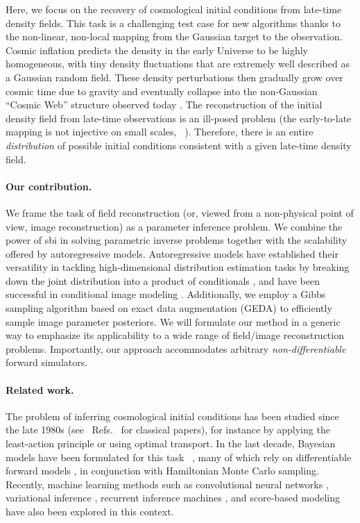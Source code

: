 Here, we focus on the recovery of cosmological initial conditions from late-time density fields. This task is a challenging test case for new algorithms thanks to the non-linear, non-local mapping from the Gaussian target to the observation.  Cosmic inflation predicts the density in the early Universe to be highly homogeneous, with tiny density fluctuations that are extremely well described as a Gaussian random field. These density perturbations then gradually grow over cosmic time due to gravity and eventually collapse into the non-Gaussian ``Cosmic Web'' structure observed today \cite{Bond:1995yt}. 
The reconstruction of the initial density field from late-time observations is an ill-posed problem (the early-to-late mapping is not injective on small scales, ~\cite[\eg,][]{Brenier:2003xs}). Therefore, there is an entire {\it distribution} of possible initial conditions consistent with a given late-time density field. 

\paragraph{Our contribution.}  We frame the task of field reconstruction (or, viewed from a non-physical point of view, image reconstruction) as a parameter inference problem.  We combine the power of \gls*{sbi} in solving parametric inverse problems together with the scalability offered by autoregressive models. Autoregressive models have established their versatility in tackling high-dimensional distribution estimation tasks by breaking down the joint distribution into a product of conditionals \cite{Papamakarios:2017tec, Uria:2016aa}, and have been successful in conditional image modeling \cite{van:2016pixel}. Additionally, we employ a Gibbs sampling algorithm based on exact data augmentation (GEDA) \cite{Marnissi:2019aa} to efficiently sample image parameter posteriors.
We will formulate our method in a generic way to emphasize its applicability to a wide range of field/image reconstruction problems. Importantly, our approach accommodates arbitrary \textit{non-differentiable} forward simulators.

\paragraph{Related work.} The problem of inferring cosmological initial conditions has been studied since the late 1980s (see \eg~Refs.~\cite{Croft:1996jw, Frisch:2001vw, Gramann:1993aa, Nusser:1992aa, Peebles:2020aa, Weinberg:1992aa} for classical papers), for instance by applying the least-action principle or using optimal transport. In the last decade, Bayesian models have been formulated for this task ~\cite[\eg,][]{Jasche:2012kq}, many of which rely on differentiable forward models \cite{Li:2022bsu, Modi:2020dyb}, in conjunction with Hamiltonian Monte Carlo sampling. 
Recently, machine learning methods such as convolutional neural networks \cite{Shallue:2022mhf, Chen:2023uup}, variational inference \cite{Modi:2022pzm}, recurrent inference machines \cite{Modi:2021acq}, and score-based modeling \cite{Legin:2023jxc} have also been explored in this context. 


